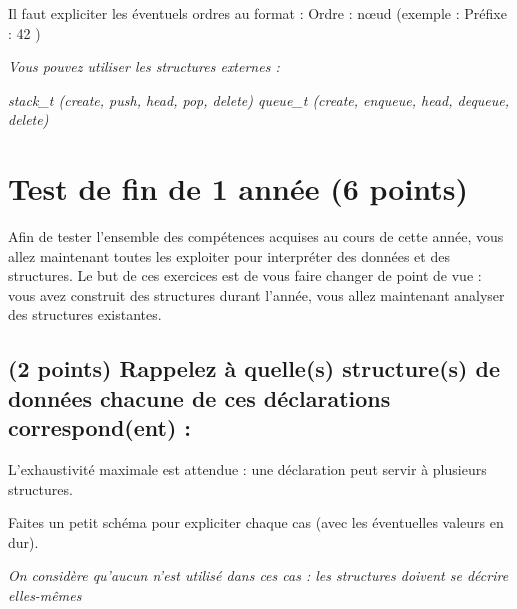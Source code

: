 \documentclass[11pt,a4paper]{article}
\begin{document}
\noindent Il faut expliciter les éventuels ordres au format : \og Ordre : nœud \fg{} (exemple : \og Préfixe : 42 \fg{})

\medskip

\noindent \textit{Vous pouvez utiliser les structures externes :}

\noindent \textit{stack\_t (create, push, head, pop, delete) \hfill queue\_t (create, enqueue, head, dequeue, delete) }

\begin{center}
\end{center}


\clearpage




\section{Test de fin de 1 année (6 points)}


\noindent Afin de tester l'ensemble des compétences acquises au cours de cette année, vous allez maintenant toutes les exploiter pour interpréter des données et des structures.
Le but de ces exercices est de vous faire changer de point de vue : vous avez construit des structures durant l'année, vous allez maintenant analyser des structures existantes.


\subsection{(2 points) Rappelez à quelle(s) structure(s) de données chacune de ces déclarations correspond(ent) : }


\noindent L'exhaustivité maximale est attendue : une déclaration peut servir à plusieurs structures.

\noindent Faites un petit schéma pour expliciter chaque cas (avec les éventuelles valeurs en dur).


\noindent \textit{On considère qu'aucun  n'est utilisé dans ces cas : les structures doivent se décrire elles-mêmes}
\end{document}
